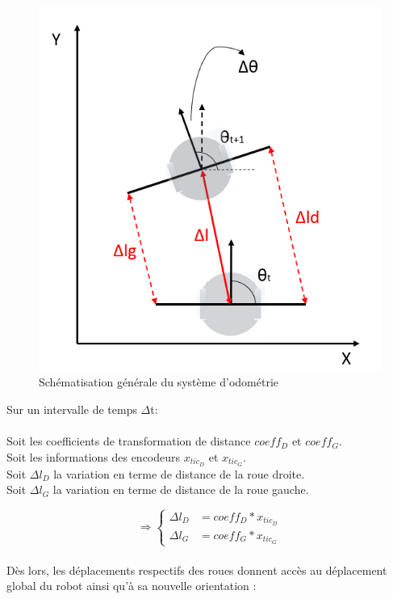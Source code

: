 \documentclass[a4paper,11pt]{article}
\begin{document}
\begin{figure}[H]
    \centering
    \includegraphics[scale = 0.9]{approxsegment.PNG}
    \caption{Schématisation générale du système d'odométrie}
    \label{fig:approx}
\end{figure}

Sur un intervalle de temps $\Delta$t:\\ \\
Soit les coefficients de transformation de distance $coeff_{D}$ et $coeff_{G}$.\\ 
Soit les informations des encodeurs $x_{tic_{D}}$ et $x_{tic_{G}}$.\\
Soit $\Delta l_{D}$ la variation en terme de distance de la roue droite.\\
Soit $\Delta l_{G}$ la variation en terme de distance de la roue gauche.

\begin{equation*}
    \Rightarrow\left\{
      \begin{aligned}
        \Delta l_{D} & = coeff_{D}*x_{tic_{D}}\\
        \Delta l_{G} & = coeff_{G}*x_{tic_{G}}
        \end{aligned}
    \right.
\end{equation*}\\
Dès lors, les déplacements respectifs des roues donnent accès au déplacement global du robot ainsi qu'à sa nouvelle orientation :
\newpage
\end{document}
